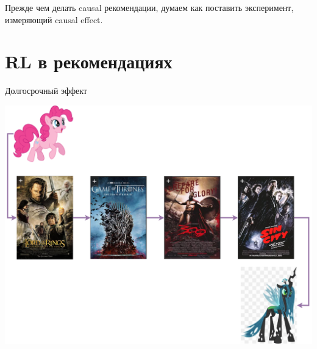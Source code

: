 \documentclass[11pt,aspectratio=169]{beamer}
\begin{document}
\begin{frame}

\begin{tcolorbox}[colback=info!5,colframe=info!80,title=]
Прежде чем делать causal рекомендации, думаем как поставить эксперимент, измеряющий causal effect.
\end{tcolorbox}

\end{frame}

\section{RL в рекомендациях}

\begin{frame}{Долгосрочный эффект}

\begin{center}
\includegraphics[scale=0.22]{images/longterm.png}
\end{center}

\end{frame}
\end{document}

